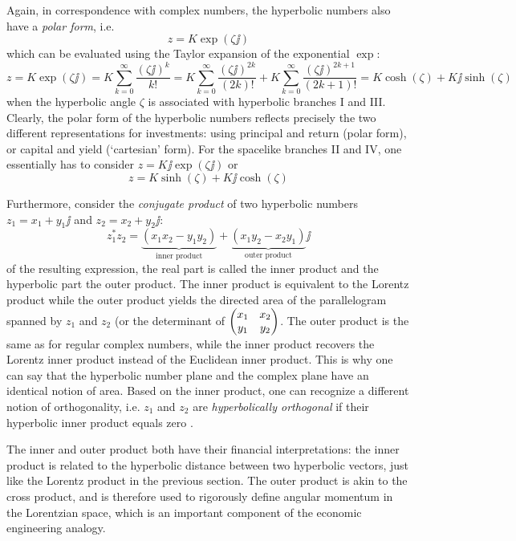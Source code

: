 Again, in correspondence with complex numbers, the hyperbolic numbers also have a  \emph{polar form}, i.e.
\[
     z = K \exp(\zeta \jj)
\]
which can be evaluated using the Taylor expansion of the exponential \(\exp\):
\[
     z = K\exp(\zeta \jj) = K \sum^\infty_{k = 0} \frac{(\zeta \jj)^k}{k!} =  K \sum^\infty_{k = 0} \frac{(\zeta \jj)^{2k}}{(2k)!} + K \sum^\infty_{k = 0} \frac{(\zeta \jj)^{2k+1}}{(2k + 1)!} = K\cosh(\zeta) + K\jj\sinh(\zeta)
\]
when the hyperbolic angle \(\zeta\) is associated with hyperbolic branches I and III. Clearly, the polar form of the hyperbolic numbers reflects precisely the two different representations for investments: using principal and return (polar form), or capital and yield (`cartesian' form). For the spacelike branches II and IV, one essentially has to consider \(z = K\jj\exp(\zeta\jj)\) or
\[
     z = K\sinh(\zeta) + K\jj\cosh(\zeta)
\]

Furthermore, consider the \emph{conjugate product} of two hyperbolic numbers \(z_1 = x_1 + y_1\jj\) and \(z_2 = x_2 + y_2\jj\):
\[
     z_1^*z_2 = \underbrace{(x_1x_2 - y_1y_2)}_\text{inner product} 
            + \underbrace{(x_1y_2 - x_2y_1)}_\text{outer product}\jj
\]
of the resulting expression, the real part is called the inner product and the hyperbolic part the outer product. The inner product is equivalent to the Lorentz product while the outer product yields the directed area of the parallelogram spanned by \(z_1\) and \(z_2\) (or the determinant of \(\mqty(x_1 & x_2\\y_1&y_2)\). The outer product is the same as for regular complex numbers, while the inner product recovers the Lorentz inner product instead of the Euclidean inner product. This is why one can say that the hyperbolic number plane and the complex plane have an identical notion of area. Based on the inner product, one can recognize a different notion of orthogonality, i.e. \(z_1\) and \(z_2\) are \emph{hyperbolically orthogonal} if their hyperbolic inner product equals zero \cite{Needham1997, Sobczyk1995}.

The inner and outer product both have their financial interpretations: the inner product is related to the hyperbolic distance between two hyperbolic vectors, just like the Lorentz product in the previous section. The outer product is akin to the cross product, and is therefore used to rigorously define angular momentum in the Lorentzian space, which is an important component of the economic engineering analogy.

